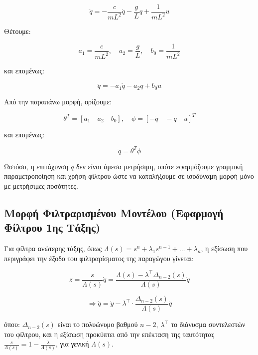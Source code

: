 \documentclass[a4paper,12pt]{report}
\begin{document}
\begin{equation}
\ddot{q} = -\frac{c}{mL^2} \dot{q} - \frac{g}{L} q + \frac{1}{mL^2} u
\end{equation}

\hspace{-0.6cm}Θέτουμε:

\[
a_1 = \frac{c}{mL^2}, \quad a_2 = \frac{g}{L}, \quad b_0 = \frac{1}{mL^2}
\]

\hspace{-0.6cm}και επομένως:

\begin{equation}
\ddot{q} = -a_1 \dot{q} - a_2 q + b_0 u
\end{equation}

\hspace{-0.6cm}Από την παραπάνω μορφή, ορίζουμε:

\[
\theta^T = [a_1 \quad a_2 \quad b_0], \quad \phi = [-\dot{q} \quad -q \quad u]^T
\]

\hspace{-0.6cm}και επομένως:

\begin{equation}
\ddot{q} = \theta^T \phi
\end{equation}

\hspace{-0.6cm}Ωστόσο, η επιτάχυνση \( \ddot{q} \) δεν είναι άμεσα μετρήσιμη, οπότε εφαρμόζουμε γραμμική παραμετροποίηση και χρήση φίλτρου ώστε να καταλήξουμε σε ισοδύναμη μορφή μόνο με μετρήσιμες ποσότητες.

\subsection*{Μορφή Φιλτραρισμένου Μοντέλου (Εφαρμογή Φίλτρου 1ης Τάξης)}

Για φίλτρα ανώτερης τάξης, όπως \(\Lambda(s) = s^n + \lambda_1 s^{n-1} + \dots + \lambda_n\), η εξίσωση που περιγράφει την έξοδο του φιλτραρίσματος της παραγώγου γίνεται:

\[
z = \frac{s}{\Lambda(s)} \dot{q} = \frac{\Lambda(s) - \lambda^\top \Delta_{n-2}(s)}{\Lambda(s)} \dot{q}
\]

\[
\Rightarrow \dot{q} = \dot{y} - \lambda^\top \cdot \frac{\Delta_{n-2}(s)}{\Lambda(s)} \dot{q}
\]

\hspace{-0.6cm}όπου:
\(\Delta_{n-2}(s)\) είναι το πολυώνυμο βαθμού \(n-2\),
\(\lambda^\top\) το διάνυσμα συντελεστών του φίλτρου,
και η εξίσωση προκύπτει από την επέκταση της ταυτότητας \(\frac{s}{\Lambda(s)} = 1 - \frac{\lambda}{\Lambda(s)}\), για γενική \(\Lambda(s)\).
\end{document}

